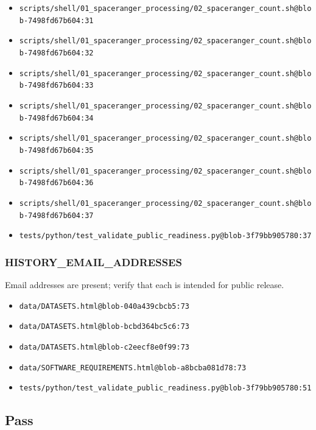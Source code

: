 \documentclass[
]{article}
\providecommand{\tightlist}{%
  \setlength{\itemsep}{0pt}\setlength{\parskip}{0pt}}
\begin{document}
\begin{itemize}
  \texttt{scripts/shell/01\_spaceranger\_processing/02\_spaceranger\_count.sh@blob-7498fd67b604:30}
\item
  \texttt{scripts/shell/01\_spaceranger\_processing/02\_spaceranger\_count.sh@blob-7498fd67b604:31}
\item
  \texttt{scripts/shell/01\_spaceranger\_processing/02\_spaceranger\_count.sh@blob-7498fd67b604:32}
\item
  \texttt{scripts/shell/01\_spaceranger\_processing/02\_spaceranger\_count.sh@blob-7498fd67b604:33}
\item
  \texttt{scripts/shell/01\_spaceranger\_processing/02\_spaceranger\_count.sh@blob-7498fd67b604:34}
\item
  \texttt{scripts/shell/01\_spaceranger\_processing/02\_spaceranger\_count.sh@blob-7498fd67b604:35}
\item
  \texttt{scripts/shell/01\_spaceranger\_processing/02\_spaceranger\_count.sh@blob-7498fd67b604:36}
\item
  \texttt{scripts/shell/01\_spaceranger\_processing/02\_spaceranger\_count.sh@blob-7498fd67b604:37}
\item
  \texttt{tests/python/test\_validate\_public\_readiness.py@blob-3f79bb905780:37}
\end{itemize}

\subsubsection{HISTORY\_EMAIL\_ADDRESSES}\label{history_email_addresses}

Email addresses are present; verify that each is intended for public
release.

\begin{itemize}
\tightlist
\item
  \texttt{data/DATASETS.html@blob-040a439cbcb5:73}
\item
  \texttt{data/DATASETS.html@blob-bcbd364bc5c6:73}
\item
  \texttt{data/DATASETS.html@blob-c2eecf8e0f99:73}
\item
  \texttt{data/SOFTWARE\_REQUIREMENTS.html@blob-a8bcba081d78:73}
\item
  \texttt{tests/python/test\_validate\_public\_readiness.py@blob-3f79bb905780:51}
\end{itemize}

\subsection{Pass}\label{pass}
\end{document}
